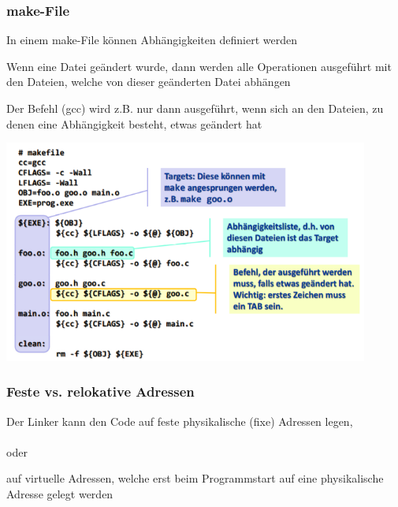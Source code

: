 			\subsubsection{make-File}
				\begin{minipage}[c]{9 cm}
					\vspace*{-1.0cm}
					\begin{compactitem}
						\item In einem make-File können Abhängigkeiten definiert werden
						\item Wenn eine Datei geändert wurde, dann werden alle Operationen ausgeführt
						mit den Dateien, welche von dieser geänderten Datei abhängen 
						\item Der Befehl (gcc) wird z.B. nur dann ausgeführt, wenn sich an den Dateien, zu
						denen eine Abhängigkeit besteht, etwas geändert hat
					\end{compactitem}
				\end{minipage}
				\hspace*{0.5cm}
				\begin{minipage}[c]{9 cm}
					\vspace*{-0.6cm}
					\includegraphics[width=0.9\textwidth]{pics/make_File.png}
				\end{minipage}
				\subsubsection{Feste vs. relokative Adressen}
					\begin{compactitem}
						\item Der Linker kann den Code auf feste physikalische (fixe) Adressen legen,\\\\
						oder\\
						\item auf virtuelle Adressen, welche erst beim Programmstart auf eine physikalische
						Adresse gelegt werden
					\end{compactitem}			
